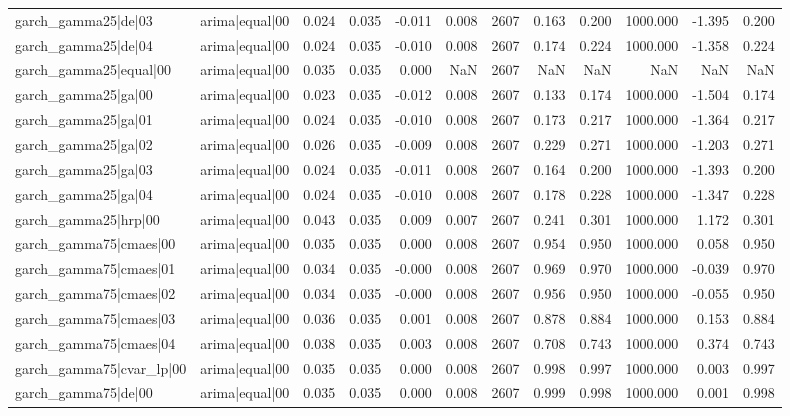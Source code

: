\begin{table}
\begin{tabular}{llrrrrrrrrrr}
garch\_gamma25|de|03 & arima|equal|00 & 0.024 & 0.035 & -0.011 & 0.008 & 2607 & 0.163 & 0.200 & 1000.000 & -1.395 & 0.200 \\
garch\_gamma25|de|04 & arima|equal|00 & 0.024 & 0.035 & -0.010 & 0.008 & 2607 & 0.174 & 0.224 & 1000.000 & -1.358 & 0.224 \\
garch\_gamma25|equal|00 & arima|equal|00 & 0.035 & 0.035 & 0.000 & NaN & 2607 & NaN & NaN & NaN & NaN & NaN \\
garch\_gamma25|ga|00 & arima|equal|00 & 0.023 & 0.035 & -0.012 & 0.008 & 2607 & 0.133 & 0.174 & 1000.000 & -1.504 & 0.174 \\
garch\_gamma25|ga|01 & arima|equal|00 & 0.024 & 0.035 & -0.010 & 0.008 & 2607 & 0.173 & 0.217 & 1000.000 & -1.364 & 0.217 \\
garch\_gamma25|ga|02 & arima|equal|00 & 0.026 & 0.035 & -0.009 & 0.008 & 2607 & 0.229 & 0.271 & 1000.000 & -1.203 & 0.271 \\
garch\_gamma25|ga|03 & arima|equal|00 & 0.024 & 0.035 & -0.011 & 0.008 & 2607 & 0.164 & 0.200 & 1000.000 & -1.393 & 0.200 \\
garch\_gamma25|ga|04 & arima|equal|00 & 0.024 & 0.035 & -0.010 & 0.008 & 2607 & 0.178 & 0.228 & 1000.000 & -1.347 & 0.228 \\
garch\_gamma25|hrp|00 & arima|equal|00 & 0.043 & 0.035 & 0.009 & 0.007 & 2607 & 0.241 & 0.301 & 1000.000 & 1.172 & 0.301 \\
garch\_gamma75|cmaes|00 & arima|equal|00 & 0.035 & 0.035 & 0.000 & 0.008 & 2607 & 0.954 & 0.950 & 1000.000 & 0.058 & 0.950 \\
garch\_gamma75|cmaes|01 & arima|equal|00 & 0.034 & 0.035 & -0.000 & 0.008 & 2607 & 0.969 & 0.970 & 1000.000 & -0.039 & 0.970 \\
garch\_gamma75|cmaes|02 & arima|equal|00 & 0.034 & 0.035 & -0.000 & 0.008 & 2607 & 0.956 & 0.950 & 1000.000 & -0.055 & 0.950 \\
garch\_gamma75|cmaes|03 & arima|equal|00 & 0.036 & 0.035 & 0.001 & 0.008 & 2607 & 0.878 & 0.884 & 1000.000 & 0.153 & 0.884 \\
garch\_gamma75|cmaes|04 & arima|equal|00 & 0.038 & 0.035 & 0.003 & 0.008 & 2607 & 0.708 & 0.743 & 1000.000 & 0.374 & 0.743 \\
garch\_gamma75|cvar\_lp|00 & arima|equal|00 & 0.035 & 0.035 & 0.000 & 0.008 & 2607 & 0.998 & 0.997 & 1000.000 & 0.003 & 0.997 \\
garch\_gamma75|de|00 & arima|equal|00 & 0.035 & 0.035 & 0.000 & 0.008 & 2607 & 0.999 & 0.998 & 1000.000 & 0.001 & 0.998 \\

\end{tabular}
\end{table}
